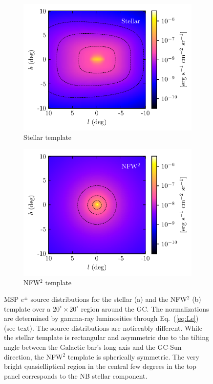 \documentclass[doublespace,nopageskip]{VTthesis} %
\begin{document}
\begin{figure}[htb]
	\centering
	\begin{subfigure}[h]{0.45\textwidth}
		\centering
		\includegraphics[scale=0.90]{Figures/IC_MSPs/injection_skymap_bulge.pdf}
		\caption{Stellar template}
		\label{sfig:first_subfig}
	\end{subfigure}
	\begin{subfigure}[h]{0.45\textwidth}
		\centering
		\includegraphics[scale=0.90]{Figures/IC_MSPs/injection_skymap_nfw.pdf}
		\caption{NFW$^2$ template}
		\label{sfig:second_subfig}
	\end{subfigure}
	\caption{MSP $e^\pm$ source distributions for the stellar (a) and the NFW$^2$ (b) template over a $20^\circ \times 20^\circ$ region around the GC. The normalizations are determined by gamma-ray luminosities through Eq.~(\ref{eq:Le}) (see text). The source distributions are noticeably different. While the stellar template is rectangular and asymmetric due to the tilting angle between the Galactic bar's long axis and the GC-Sun direction, the NFW$^2$ template is spherically symmetric. The very bright quasielliptical region in the central few degrees in the top panel corresponds to the NB stellar component.}
	\label{fig:main_figure}
\end{figure}
\end{document}
